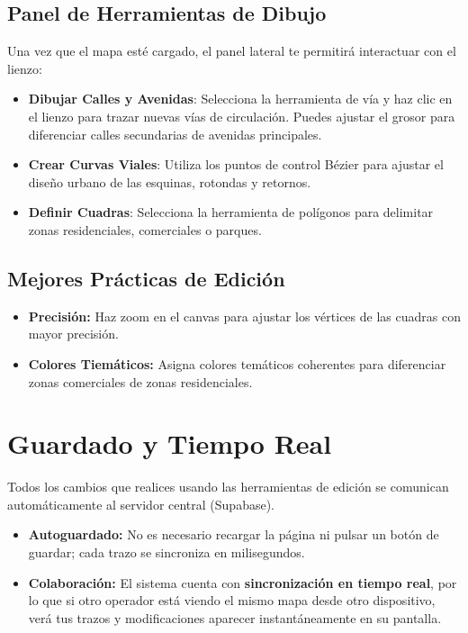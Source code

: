 \documentclass[12pt,a4paper]{article}
\begin{document}
\subsection{Panel de Herramientas de Dibujo}
Una vez que el mapa esté cargado, el panel lateral te permitirá interactuar con el lienzo:
\begin{itemize}
    \item \textbf{Dibujar Calles y Avenidas}: Selecciona la herramienta de vía y haz clic en el lienzo para trazar nuevas vías de circulación. Puedes ajustar el grosor para diferenciar calles secundarias de avenidas principales.
    \item \textbf{Crear Curvas Viales}: Utiliza los puntos de control Bézier para ajustar el diseño urbano de las esquinas, rotondas y retornos.
    \item \textbf{Definir Cuadras}: Selecciona la herramienta de polígonos para delimitar zonas residenciales, comerciales o parques.
\end{itemize}

\subsection{Mejores Prácticas de Edición}
\begin{itemize}
    \item \textbf{Precisión:} Haz zoom en el canvas para ajustar los vértices de las cuadras con mayor precisión.
    \item \textbf{Colores Tiemáticos:} Asigna colores temáticos coherentes para diferenciar zonas comerciales de zonas residenciales.
\end{itemize}

\section{Guardado y Tiempo Real}
Todos los cambios que realices usando las herramientas de edición se comunican automáticamente al servidor central (Supabase).
\begin{itemize}
    \item \textbf{Autoguardado:} No es necesario recargar la página ni pulsar un botón de guardar; cada trazo se sincroniza en milisegundos.
    \item \textbf{Colaboración:} El sistema cuenta con \textbf{sincronización en tiempo real}, por lo que si otro operador está viendo el mismo mapa desde otro dispositivo, verá tus trazos y modificaciones aparecer instantáneamente en su pantalla.
\end{itemize}
\end{document}
